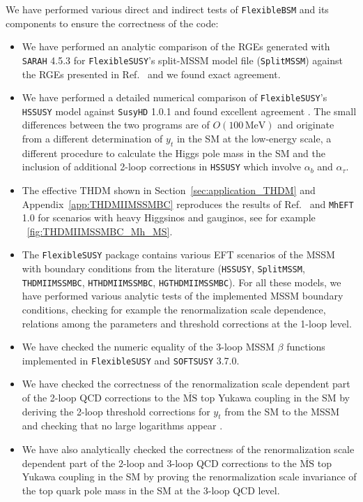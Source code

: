 \documentclass[final,3p,11pt,pdflatex]{elsarticle}
\makeatletter
\newcommand{\modelname}[1]{\texttt{#1}\@\xspace}
\newcommand{\sarah}{\texttt{SARAH}\@\xspace}
\newcommand{\fs}{\texttt{FlexibleSUSY}\@\xspace}
\newcommand{\HSSUSY}{\modelname{HSSUSY}}
\newcommand{\susyhd}{\texttt{SusyHD}\@\xspace}
\newcommand{\MhEFT}{\texttt{MhEFT}\@\xspace}
\newcommand{\softsusy}{\texttt{SOFTSUSY}\@\xspace}
\newcommand{\fbsm}{\texttt{FlexibleBSM}\@\xspace}
\newcommand{\ol}[1]{\overline{#1}}
\newcommand{\MSbar}{\ensuremath{\ol{\text{MS}}}\xspace}
\newcommand{\unit}[1]{\,\text{#1}}      %
\newcommand{\THDM}{\ensuremath{\text{THDM}}\xspace}
\newcommand{\figref}[1]{\figurename~\ref{#1}}
\newcommand{\secref}[1]{Section~\ref{#1}}
\newcommand{\appref}[1]{Appendix~\ref{#1}}
\def\ab{\alpha_b}
\def\atau{\alpha_{\tau}}
\makeatother
\begin{document}
We have performed various direct and indirect tests of \fbsm and its
components to ensure the correctness of the code:
%
\begin{itemize}
\item We have performed an analytic comparison of the RGEs generated
  with \sarah 4.5.3 for \fs's split-MSSM model file
  (\modelname{SplitMSSM}) against the RGEs presented in
  Ref.~\cite{Benakli:2013msa} and we found exact agreement.
\item We have performed a detailed numerical comparison of \fs's
  \HSSUSY model against \susyhd 1.0.1 and found excellent agreement
  \cite{Athron:2016fuq}.  The small differences between the two
  programs are of $O(100\unit{MeV})$ and originate from a
  different determination of $y_t$ in the SM at the low-energy scale,
  a different procedure to calculate the Higgs pole mass in the SM and
  the inclusion of additional 2-loop corrections in \HSSUSY which
  involve $\ab$ and $\atau$.
\item The effective \THDM shown in \secref{sec:application_THDM} and
  \appref{app:THDMIIMSSMBC} reproduces the results of
  Ref.~\cite{Lee:2015uza} and \MhEFT 1.0 \cite{MhEFT} for scenarios with
  heavy Higgsinos and gauginos, see for example
  \figref{fig:THDMIIMSSMBC_Mh_MS}.
\item The \fs package contains various EFT scenarios of the MSSM with
  boundary conditions from the literature (\HSSUSY,
  \modelname{SplitMSSM}, \modelname{THDMIIMSSMBC}, \modelname{HTHDMIIMSSMBC},
  \modelname{HGTHDMIIMSSMBC}).  For all these models, we have performed
  various analytic tests of the implemented MSSM boundary conditions,
  checking for example the renormalization scale dependence, relations
  among the parameters and threshold corrections at the
  1-loop level.
\item We have checked the numeric equality of the 3-loop MSSM $\beta$
  functions implemented in \fs and \softsusy 3.7.0.
\item We have checked the correctness of the renormalization scale
  dependent part of the 2-loop QCD corrections to the \MSbar top
  Yukawa coupling in the SM by deriving the 2-loop
  threshold corrections for $y_t$ from the SM to the MSSM
  and checking that no large logarithms appear
  \cite{ThomasKwasnitza:2016yqj}.
\item We have also analytically checked the correctness of the
  renormalization scale dependent part of the 2-loop and 3-loop QCD
  corrections to the \MSbar top Yukawa coupling in the SM
  by proving the renormalization scale invariance of the top quark
  pole mass in the SM at the 3-loop QCD level.
\end{itemize}
\end{document}
